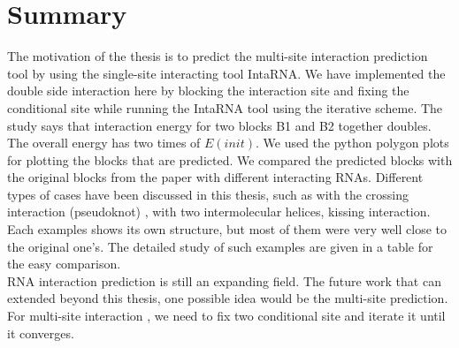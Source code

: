 \documentclass[twoside,a4paper]{report}
\begin{document}
	
%	
%	
%	
%	
%	 
%
%
%	  
%	 
%	
%	 
%	 
%	 
	
		\chapter{Summary}
		
	The motivation of the thesis is to predict the multi-site interaction prediction tool by using the single-site interacting tool IntaRNA. We have implemented the double side interaction here by blocking the interaction site and fixing the conditional site while running the IntaRNA tool using the iterative scheme. The study says that interaction energy for two blocks B1 and B2 together doubles. The overall energy has two times of $E(init)$. We used the python polygon plots for plotting the blocks that are predicted. We compared the predicted blocks with the original blocks from the paper with different interacting RNAs. Different types of cases have been discussed in this thesis, such as with the crossing interaction (pseudoknot) , with two intermolecular helices, kissing interaction. Each examples shows its own structure, but most of them were very well close to the original one's. The detailed study of such examples are given in a table for the easy comparison.  \\ 
	
	
	RNA interaction prediction is still an expanding field. The future work that can extended beyond this thesis, one possible idea would be the multi-site prediction. For multi-site interaction , we need to fix two conditional site and iterate it until it converges.  \\
	
\end{document}
